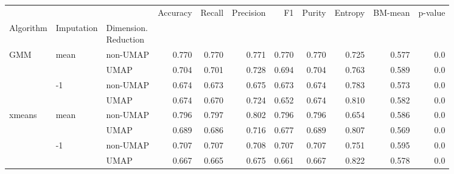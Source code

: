 \begin{tabular}{lllrrrrrrrr}
\toprule
       &    &      &  Accuracy &  Recall &  Precision &     F1 &  Purity &  Entropy &  BM-mean &  p-value \\
Algorithm & Imputation & \thead{Dimension. \\Reduction} &           &         &            &        &         &          &          &          \\
\midrule
GMM & mean & non-UMAP &     0.770 &   0.770 &      0.771 &  0.770 &   0.770 &    0.725 &    0.577 &      0.0 \\
       &    & UMAP &     0.704 &   0.701 &      0.728 &  0.694 &   0.704 &    0.763 &    0.589 &      0.0 \\
       & -1 & non-UMAP &     0.674 &   0.673 &      0.675 &  0.673 &   0.674 &    0.783 &    0.573 &      0.0 \\
       &    & UMAP &     0.674 &   0.670 &      0.724 &  0.652 &   0.674 &    0.810 &    0.582 &      0.0 \\
xmeans & mean & non-UMAP &     0.796 &   0.797 &      0.802 &  0.796 &   0.796 &    0.654 &    0.586 &      0.0 \\
       &    & UMAP &     0.689 &   0.686 &      0.716 &  0.677 &   0.689 &    0.807 &    0.569 &      0.0 \\
       & -1 & non-UMAP &     0.707 &   0.707 &      0.708 &  0.707 &   0.707 &    0.751 &    0.595 &      0.0 \\
       &    & UMAP &     0.667 &   0.665 &      0.675 &  0.661 &   0.667 &    0.822 &    0.578 &      0.0 \\
\bottomrule
\end{tabular}
